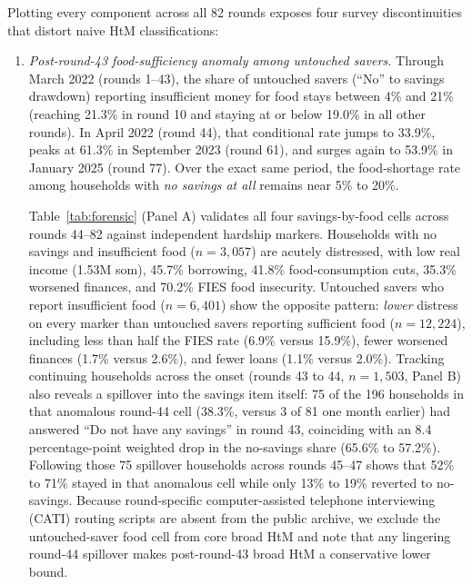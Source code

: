 \documentclass[11pt]{article}
\begin{document}
Plotting every component across all 82 rounds exposes four survey discontinuities that distort naive HtM classifications:

\begin{enumerate}
\item \textit{Post-round-43 food-sufficiency anomaly among untouched savers.} Through March 2022 (rounds 1--43), the share of untouched savers (``No'' to savings drawdown) reporting insufficient money for food stays between 4\% and 21\% (reaching 21.3\% in round 10 and staying at or below 19.0\% in all other rounds). In April 2022 (round 44), that conditional rate jumps to 33.9\%, peaks at 61.3\% in September 2023 (round 61), and surges again to 53.9\% in January 2025 (round 77). Over the exact same period, the food-shortage rate among households with \textit{no savings at all} remains near 5\% to 20\%.

Table~\ref{tab:forensic} (Panel A) validates all four savings-by-food cells across rounds 44--82 against independent hardship markers. Households with no savings and insufficient food ($n = 3{,}057$) are acutely distressed, with low real income (1.53M som), 45.7\% borrowing, 41.8\% food-consumption cuts, 35.3\% worsened finances, and 70.2\% FIES food insecurity. Untouched savers who report insufficient food ($n = 6{,}401$) show the opposite pattern: \textit{lower} distress on every marker than untouched savers reporting sufficient food ($n = 12{,}224$), including less than half the FIES rate (6.9\% versus 15.9\%), fewer worsened finances (1.7\% versus 2.6\%), and fewer loans (1.1\% versus 2.0\%). Tracking continuing households across the onset (rounds 43 to 44, $n = 1{,}503$, Panel B) also reveals a spillover into the savings item itself: 75 of the 196 households in that anomalous round-44 cell (38.3\%, versus 3 of 81 one month earlier) had answered ``Do not have any savings'' in round 43, coinciding with an 8.4 percentage-point weighted drop in the no-savings share (65.6\% to 57.2\%). Following those 75 spillover households across rounds 45--47 shows that 52\% to 71\% stayed in that anomalous cell while only 13\% to 19\% reverted to no-savings. Because round-specific computer-assisted telephone interviewing (CATI) routing scripts are absent from the public archive, we exclude the untouched-saver food cell from core broad HtM and note that any lingering round-44 spillover makes post-round-43 broad HtM a conservative lower bound.


\end{enumerate}
\end{document}

